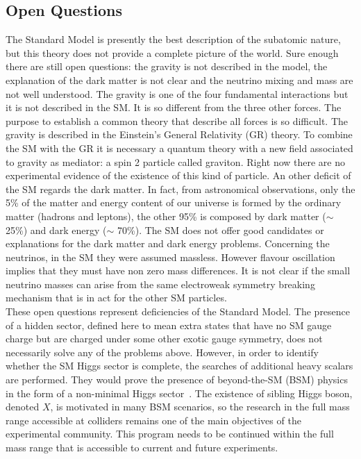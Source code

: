 \subsection*{Open Questions} The Standard Model is presently the best description of the subatomic nature, but this theory does not provide a complete picture of the world. Sure enough there are still open questions: the gravity is not described in the model, the explanation of the dark matter is not clear and the  neutrino mixing and mass are not well understood.
The gravity is one of the four fundamental interactions but it is not described in the  SM. It is so different from the three other
forces. The purpose to establish a common theory that describe all forces is so difficult. The gravity is described in the  Einstein’s General Relativity (GR) theory. To combine the  SM with the GR it is necessary a quantum theory with a new field associated to gravity  as mediator: a spin 2 particle called graviton. Right now there are no experimental evidence of the existence of this kind of particle. 
An other deficit of the SM regards the dark matter. In fact, from astronomical observations, only the 5\% of the  matter and energy content of our universe is formed by the ordinary matter (hadrons and leptons), the other 95\% is composed by dark matter ($\sim$ 25\%) and dark energy ($\sim$ 70\%). The SM does not offer good candidates or explanations for the dark matter and dark energy problems.
Concerning the neutrinos, in the SM they were assumed massless. However flavour oscillation implies that they must have non zero mass differences.
It is not clear if the small neutrino masses  can arise from the same electroweak symmetry breaking mechanism that
is in act for the other SM particles.\\
\newline
These open questions represent  deficiencies of the Standard Model. 
The presence of a hidden sector, defined here to mean extra states that
have no SM gauge charge but are charged under some other exotic gauge symmetry, does not necessarily solve any of the problems above. However, in order to identify whether the SM Higgs sector is complete,  the searches of additional heavy scalars are performed.  They would prove the presence of beyond-the-SM (BSM) physics in the form of a non-minimal Higgs sector~\cite{Robens:2015gla}. The existence of sibling Higgs boson, denoted $X$, is motivated in many BSM scenarios, so the research in the full mass range accessible at colliders  remains one of the main objectives of the experimental community. This  program  needs  to  be continued within the full mass range that is accessible to current and future experiments.
\newline
